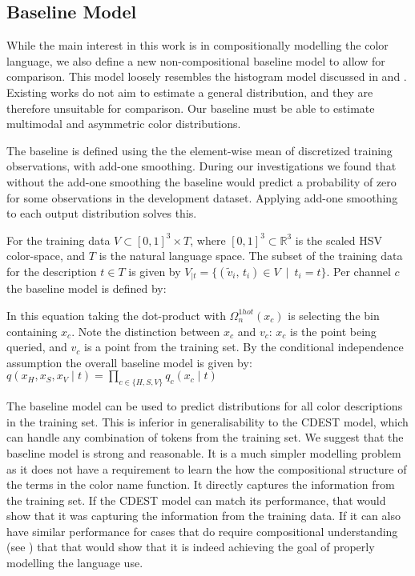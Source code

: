 \documentclass[11pt,a4paper]{article}
\newcommand{\compactmath}[1]{\noindent\resizebox{\columnwidth}{!}{$#1$}}
\newcommand{\textcite}{\citet}
\begin{document}
\subsection{Baseline Model}\label{sec:baseline-model}
While the main interest in this work is in compositionally modelling the color language,
we also define a new non-compositional baseline model to allow for comparison.
This model loosely resembles the histogram model discussed in \textcite{meomcmahanstone:color} and \textcite{mcmahan2015bayesian}.
Existing works do not aim to estimate a general distribution, and they are therefore unsuitable for comparison.
Our baseline must be able to estimate multimodal and asymmetric color distributions.

The baseline is defined using the the element-wise mean of discretized  training observations, with add-one smoothing.
During our investigations we found that without the add-one smoothing the baseline would predict a probability of zero for some observations in the development dataset.
Applying add-one smoothing to each output distribution solves this.

For the training data $V \subset \left[ 0,1 \right] ^{3}\times T$, where $\left[ 0,1 \right] ^{3} \subset \mathbb{R}^{3}$ is the scaled HSV color-space, and $T$ is the natural language space.
The subset of the training data for the description $t \in T$ is given by
$V_{|t}=\{(\tilde{v}_i,\,t_i) \in V \: \mid \: t_{i}=t\}$.
Per channel $c$ the baseline model is defined by: 

\compactmath{
	q_{c}(x_{c}\mid t)=\frac{\displaystyle
		\sum_{\mathrlap{\!\!\forall((v_{H},v_{S},v_{V}),t)\in V_{|t}}}
			\Omega_n^{blur}(v_{c},\mathcal{D}_c,\sigma)
			\cdot
			\Omega_n^{1hot}(x_{c})		
			+1}
		{\left|V_{|t}\right|+n}
}
%
In this equation taking the dot-product with $\Omega_n^{1hot}(x_{c})$ is selecting the bin containing $x_c$.
Note the distinction between $x_c$ and $v_c$: $x_c$ is the point being queried, and $v_c$ is a point from the training set.
By the conditional independence assumption the overall baseline model is given by: $q(x_H,x_S,x_V\mid t) = \prod_{c\in {\{H,S,V\}}} q_c(x_c\mid t)$


The baseline model can be used to predict distributions for all color descriptions in the training set.
This is inferior in generalisability to the CDEST model, which can handle any combination of tokens from the training set.
We suggest that the baseline model is strong and reasonable.
It is a much simpler modelling problem as it does not have a requirement to learn the how the compositional structure of the terms in the color name function.
It directly captures the information from the training set.
If the CDEST model can match its performance, that would show that it was capturing the information from the training data.
If it can also have similar performance for cases that do require compositional understanding (see ) that that would show that it is indeed achieving the goal of properly modelling the language use.
\end{document}
